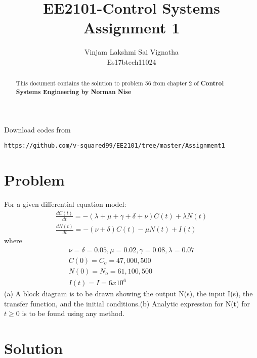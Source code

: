 \documentclass[journal,12pt,twocolumn]{IEEEtran}
\begin{document}
\title{EE2101-Control Systems Assignment 1}
\author{Vinjam Lakshmi Sai Vignatha \\ Es17btech11024}
\maketitle
\newpage
\bigskip
\renewcommand{\thefigure}{\theenumi}
\renewcommand{\thetable}{\theenumi}
Download codes from 
\begin{lstlisting}
https://github.com/v-squared99/EE2101/tree/master/Assignment1
\end{lstlisting}
\begin{abstract}
This document contains the solution to problem 56 from chapter 2 of \textbf{Control Systems Engineering by Norman Nise}
\end{abstract}

\section{Problem}
For a given differential equation model: 
\begin{align}
\frac{dC(t)}{dt} = -(\lambda + \mu + \gamma + \delta + \nu)C(t) + \lambda N(t)
\\\frac{dN(t)}{dt} = -(\nu + \delta)C(t) - \mu N(t) + I(t)
\end{align}
where
\begin{align}
\nu = \delta = 0.05, \mu = 0.02, \gamma = 0.08, \lambda = 0.07
\\ C(0) = C_o = 47,000,500
\\N(0) = N_o = 61,100,500 
\\I(t) = I = 6 x 10^6
\end{align}
(a) A block diagram is to be drawn showing the output N(s), the input I(s), the transfer function, and the initial conditions.\newline(b) Analytic expression for N(t) for $t \geq 0$ is to be found using any method. 


\section{Solution}
\end{document}
